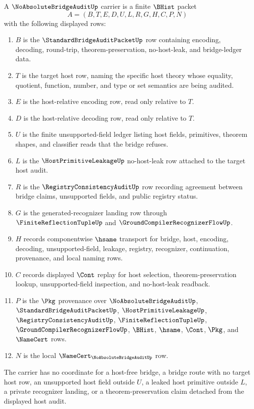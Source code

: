 \begin{definition}
\label{def:no-absolute-bridge-audit-carrier}
A $\NoAbsoluteBridgeAuditUp$ carrier is a finite $\BHist$ packet
$$
A=(B,T,E,D,U,L,R,G,H,C,P,N)
$$
with the following displayed rows:
\begin{enumerate}
\item $B$ is the $\StandardBridgeAuditPacketUp$ row containing encoding, decoding, round-trip, theorem-preservation, no-host-leak, and bridge-ledger data.
\item $T$ is the target host row, naming the specific host theory whose equality, quotient, function, number, and type or set semantics are being audited.
\item $E$ is the host-relative encoding row, read only relative to $T$.
\item $D$ is the host-relative decoding row, read only relative to $T$.
\item $U$ is the finite unsupported-field ledger listing host fields, primitives, theorem shapes, and classifier reads that the bridge refuses.
\item $L$ is the $\HostPrimitiveLeakageUp$ no-host-leak row attached to the target host audit.
\item $R$ is the $\RegistryConsistencyAuditUp$ row recording agreement between bridge claims, unsupported fields, and public registry status.
\item $G$ is the generated-recognizer landing row through $\FiniteReflectionTupleUp$ and $\GroundCompilerRecognizerFlowUp$.
\item $H$ records componentwise $\hsame$ transport for bridge, host, encoding, decoding, unsupported-field, leakage, registry, recognizer, continuation, provenance, and local naming rows.
\item $C$ records displayed $\Cont$ replay for host selection, theorem-preservation lookup, unsupported-field inspection, and no-host-leak readback.
\item $P$ is the $\Pkg$ provenance over $\NoAbsoluteBridgeAuditUp$, $\StandardBridgeAuditPacketUp$, $\HostPrimitiveLeakageUp$, $\RegistryConsistencyAuditUp$, $\FiniteReflectionTupleUp$, $\GroundCompilerRecognizerFlowUp$, $\BHist$, $\hsame$, $\Cont$, $\Pkg$, and $\NameCert$ rows.
\item $N$ is the local $\NameCert_{\NoAbsoluteBridgeAuditUp}$ row.
\end{enumerate}
The carrier has no coordinate for a host-free bridge, a bridge route with no target host row, an unsupported host field outside $U$, a leaked host primitive outside $L$, a private recognizer landing, or a theorem-preservation claim detached from the displayed host audit.
\end{definition}

